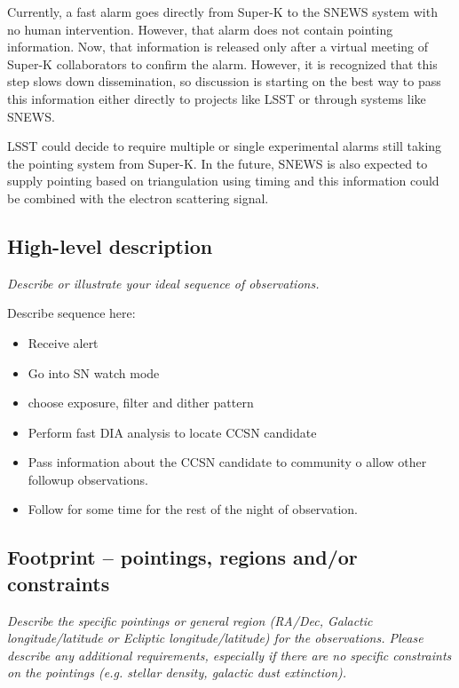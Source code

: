 \documentclass[12pt, letterpaper]{article}
\newcommand{\superk}  {Super\nobreakdash-K\xspace}
\begin{document}
Currently, a fast alarm goes directly from \superk to the SNEWS system
with no human intervention.  However, that alarm does not contain
pointing information.  Now, that information is released only after a
virtual meeting of \superk collaborators to confirm the alarm.
However, it is recognized that this step slows down dissemination, so
discussion is starting on the best way to pass this information either
directly to projects like LSST or through systems like SNEWS.

LSST could decide to require multiple or single experimental alarms
still taking the pointing system from \superk.  In the future, SNEWS
is also expected to supply pointing based on triangulation using
timing and this information could be combined with the electron
scattering signal.

\subsection{High-level description}
\begin{footnotesize}
{\it Describe or illustrate your ideal sequence of observations.}
\end{footnotesize}

\vspace{.3in}


Describe sequence here:

\begin{itemize}
\item Receive alert
\item Go into SN watch mode
\item choose exposure, filter and dither pattern
\item Perform fast DIA analysis to locate CCSN candidate
\item Pass information about the CCSN candidate to community o allow
  other followup observations.
\item Follow for some time for the rest of the night of observation.
\end{itemize}

\subsection{Footprint -- pointings, regions and/or constraints}
\begin{footnotesize}{\it Describe the specific pointings or general region (RA/Dec, Galactic longitude/latitude or 
Ecliptic longitude/latitude) for the observations. Please describe any additional requirements, especially if there
are no specific constraints on the pointings (e.g. stellar density, galactic dust extinction).}
\end{footnotesize}
\end{document}
